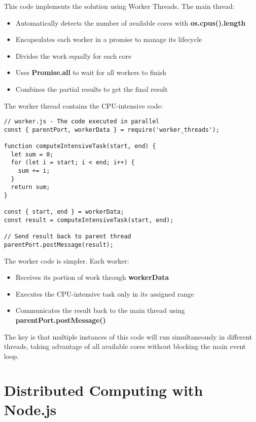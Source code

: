 \documentclass[12pt,letterpaper]{article}
\newenvironment{macterminal}{%
    \begin{mdframed}[
        linecolor=terminalFrame,
        backgroundcolor=terminalBg,
        roundcorner=5pt,
        skipabove=5pt,
        skipbelow=5pt,
        linewidth=1pt,
        innertopmargin=5pt,
        frametitle={%
            \tikz[baseline=(current bounding box.east), outer sep=0pt]{
                \fill[red!80!black] (0,0) circle (5pt);
                \fill[yellow!80!black] (0.7,0) circle (5pt);
                \fill[green!70!black] (1.4,0) circle (5pt);
            }
        },
        frametitlealignment=\raggedright,
        frametitleaboveskip=8pt,
        frametitlebelowskip=0pt,
    ]
}{%
    \end{mdframed}%
}
\begin{document}
This code implements the solution using Worker Threads. The main thread:
\begin{itemize}
    \item Automatically detects the number of available cores with \textbf{\textcolor{accentColor}{os.cpus().length}}
    \item Encapsulates each worker in a promise to manage its lifecycle
    \item Divides the work equally for each core
    \item Uses \textbf{\textcolor{accentColor}{Promise.all}} to wait for all workers to finish
    \item Combines the partial results to get the final result
\end{itemize}

The worker thread contains the CPU-intensive code:

\begin{macterminal}
\begin{lstlisting}
// worker.js - The code executed in parallel
const { parentPort, workerData } = require('worker_threads');

function computeIntensiveTask(start, end) {
  let sum = 0;
  for (let i = start; i < end; i++) {
    sum += i;
  }
  return sum;
}

const { start, end } = workerData;
const result = computeIntensiveTask(start, end);

// Send result back to parent thread
parentPort.postMessage(result);
\end{lstlisting}
\end{macterminal}

The worker code is simpler. Each worker:
\begin{itemize}
    \item Receives its portion of work through \textbf{\textcolor{accentColor}{workerData}}
    \item Executes the CPU-intensive task only in its assigned range
    \item Communicates the result back to the main thread using \textbf{\textcolor{accentColor}{parentPort.postMessage()}}
\end{itemize}

The key is that multiple instances of this code will run simultaneously in different threads, taking advantage of all available cores without blocking the main event loop.

\section{Distributed Computing with Node.js}
\end{document}
